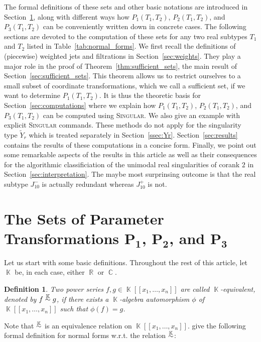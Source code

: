 \documentclass{amsproc}
\newtheorem{defn}[theorem]{Definition}
\theoremstyle{definition}
\newcommand{\Singular}{\textsc{Singular}}
\newcommand{\tY}{\widetilde{Y}}
\DeclareMathOperator{\R}{\mathbb{R}}
\DeclareMathOperator{\C}{\mathbb{C}}
\DeclareMathOperator{\K}{\mathbb{K}}
\newcommand{\ksim}{\ensuremath{\mathrel{%
  \raisebox{0pt}[\heightof{$\overset{\scriptscriptstyle\K}{\sim}$}]{%
    $\overset{\K}{\sim}$%
  }%
}}}
\begin{document}
The formal definitions of these sets and other basic notations are introduced
in Section~\ref{sec:Psets}, along with different ways how $P_1(T_1, T_2)$,
$P_2(T_1, T_2)$, and $P_3(T_1, T_2)$ can be conveniently written down in
concrete cases. The following sections are devoted to the computation of these
sets for any two real subtypes $T_1$ and $T_2$ listed in
Table~\ref{tab:normal_forms}. We first recall the definitions of (piecewise)
weighted jets and filtrations in Section~\ref{sec:weights}. They play a major
role in the proof of Theorem~\ref{thm:sufficient_sets}, the main result of
Section~\ref{sec:sufficient_sets}. This theorem allows us to restrict ourselves
to a small subset of coordinate transformations, which we call a sufficient
set, if we want to determine $P_1(T_1, T_2)$. It is thus the theoretic basis
for Section~\ref{sec:computations} where we explain how $P_1(T_1, T_2)$,
$P_2(T_1, T_2)$, and $P_3(T_1, T_2)$ can be computed using \Singular{}. We also
give an example with explicit \Singular{} commands. These methods do not apply
for the singularity type $\tY_r$ which is treated separately in
Section~\ref{ssec:Yr}. Section~\ref{sec:results} contains the results of these
computations in a concise form. Finally, we point out some remarkable aspects
of the results in this article as well as their consequences for the
algorithmic classificiation of the unimodal real singularities of corank $2$ in
Section~\ref{sec:interpretation}. The maybe most surprinsing outcome is that
the real subtype $J_{10}^-$ is actually redundant whereas $J_{10}^+$ is not.


\section{The Sets of Parameter Transformations
$\boldsymbol{P_1}$, $\boldsymbol{P_2}$, and $\boldsymbol{P_3}$}%
\label{sec:Psets}

Let us start with some basic definitions. Throughout the rest of this article,
let $\K$ be, in each case, either $\R$ or $\C$.

\begin{defn}
Two power series $f, g \in \K[[x_1,\ldots,x_n]]$ are called $\K$-equivalent,
denoted by $f \ksim g$, if there exists a $\K$-algebra automorphism
$\phi$ of $\K[[x_1,\ldots,x_n]]$ such that $\phi(f) = g$.
\end{defn}

Note that $\ksim$ is an equivalence relation on $ \K[[x_1,\ldots,x_n]]$.
\citet{AVG1985} give the following formal definition for normal forms w.r.t.\@
the relation $\ksim$:
\end{document}
